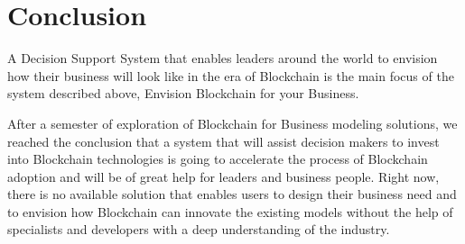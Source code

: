 \chapter{Conclusion}
\label{chapter:conclusion}
A Decision Support System that enables leaders around the world to envision how their business will look like in the era of Blockchain is the main focus of the system described above,  Envision Blockchain for your Business.

After a semester of exploration of Blockchain for Business modeling solutions, we reached the conclusion that a system that will assist decision makers to invest into Blockchain technologies is going to accelerate the process of Blockchain adoption and will be of great help for leaders and business people. Right now, there is no available solution that enables users to design their business need and to envision how Blockchain can innovate the existing models without the help of specialists and developers with a deep understanding of the industry.